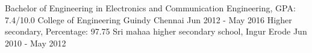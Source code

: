 
\begin{cventries}
  \cveducation
    {Bachelor of Engineering in Electronics and Communication Engineering, GPA: 7.4/10.0} %
    {College of Engineering Guindy} %
    {Chennai} %
    {Jun 2012 - May 2016} %
  \cveducation
    {Higher secondary, Percentage: 97.75} %
    {Sri mahaa higher secondary school, Ingur} %
    {Erode} %
    {Jun 2010 - May 2012} %
\end{cventries}
